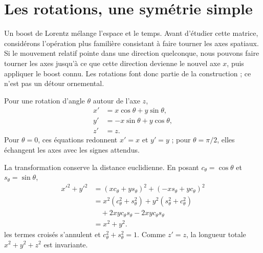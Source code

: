 \begin{classroomqa}\end{classroomqa}

\section{Les rotations, une symétrie simple}

Un boost de Lorentz mélange l’espace et le temps. Avant d’étudier cette matrice, considérons l’opération plus familière consistant à faire tourner les axes spatiaux. Si le mouvement relatif pointe dans une direction quelconque, nous pouvons faire tourner les axes jusqu’à ce que cette direction devienne le nouvel axe \(x\), puis appliquer le boost connu. Les rotations font donc partie de la construction ; ce n’est pas un détour ornemental.

Pour une rotation d’angle \(\theta\) autour de l’axe \(z\),
\begin{align}
x'&=x\cos\theta+y\sin\theta,\nonumber\\
y'&=-x\sin\theta+y\cos\theta,\label{eq:l5-rotation}\\
z'&=z.\nonumber
\end{align}
Pour \(\theta=0\), ces équations redonnent \(x'=x\) et \(y'=y\) ; pour \(\theta=\pi/2\), elles échangent les axes avec les signes attendus.

La transformation conserve la distance euclidienne. En posant
\(c_\theta=\cos\theta\) et \(s_\theta=\sin\theta\),
\begin{align}
x'^2+y'^2
&=(xc_\theta+ys_\theta)^2+(-xs_\theta+yc_\theta)^2\nonumber\\
&=x^2(c_\theta^2+s_\theta^2)
  +y^2(s_\theta^2+c_\theta^2)\nonumber\\
&\quad+2xyc_\theta s_\theta-2xyc_\theta s_\theta\nonumber\\
&=x^2+y^2.
\end{align}
les termes croisés s’annulent et \(c_\theta^2+s_\theta^2=1\). Comme \(z'=z\), la longueur totale \(x^2+y^2+z^2\) est invariante.

